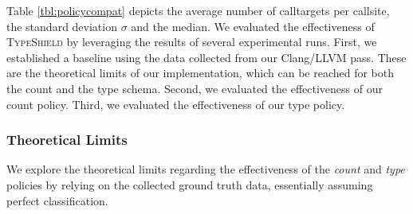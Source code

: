 \begin{table*}[htbp!]
\begin{center}
{\begin{tabular}{l|r|rcl|r|rcl|r|rcl|r|rcl|r}
    	\end{tabular}

}
	\caption {Results for allowed callsites per calltarget for several programs compiled with 
	Clang using optimization level \texttt{-O2}. Note that the basic restriction to address taken only calltargets (see column AT) is 
	present for each other series. The label $count^*$ denotes the best possible reduction using our \emph{count} policy 
	based on the ground truth collected by our Clang/LLVM pass, while $count$ denotes the results of our implementation of 
	the \emph{count} policy derived from the binaries. The same applies to $type*$ and $type$ regarding the \emph{type} policy. 
	A lower number of calltargets per callsite indicates better results. Note that our \emph{type} policy is superior to 
	the \emph{count} policy, as it allows for a stronger reduction of allowed calltargets. 
	We consider this a good result which further improves the state-of-the-art. 
	Finally, we provide the median and the pair of mean and standard deviation to allow for a 
	better comparison with other state-of-the-art tools.
        }
	\label{tbl:policycompat}
\end{center}
\vspace{-.5cm}
\end{table*}
Table \ref{tbl:policycompat} depicts the average number of calltargets per callsite, the standard deviation $\sigma$ and the median. 
We evaluated the effectiveness of \textsc{TypeShield} by leveraging the results of several experimental runs.
First, we established a baseline using the data collected from our Clang/LLVM pass. These are the theoretical limits of our implementation, which can be reached for both the {count} and the {type} schema. 
Second, we evaluated the effectiveness of our {count} policy. Third, we evaluated the effectiveness of our {type} policy. 

\subsubsection{Theoretical Limits}
\label{subsection:theoreticallimit}
We explore the theoretical limits regarding the effectiveness of the \textit{count} and \textit{type} policies by relying on the collected ground truth data, essentially assuming perfect classification.

